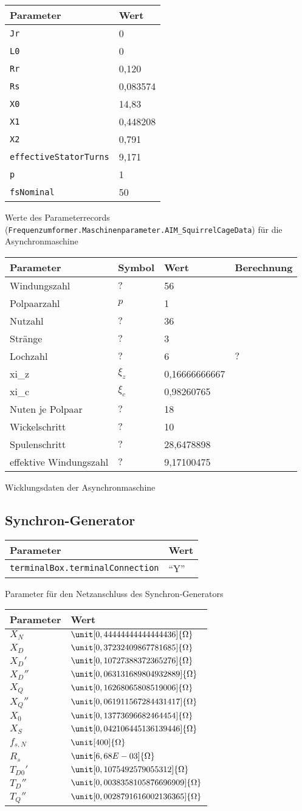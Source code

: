 \begin{longtable}[]{@{}ll@{}}
\toprule
Parameter & Wert\tabularnewline
\midrule
\endhead
\texttt{Jr} & 0\tabularnewline
\texttt{L0} & 0\tabularnewline
\texttt{Rr} & 0,120\tabularnewline
\texttt{Rs} & 0,083574\tabularnewline
\texttt{X0} & 14,83\tabularnewline
\texttt{X1} & 0,448208\tabularnewline
\texttt{X2} & 0,791\tabularnewline
\texttt{effectiveStatorTurns} & 9,171\tabularnewline
\texttt{p} & 1\tabularnewline
\texttt{fsNominal} & 50\tabularnewline
\bottomrule
\end{longtable}

Werte des Parameterrecords
(\texttt{Frequenzumformer.Maschinenparameter.AIM\_SquirrelCageData}) für
die Asynchronmaschine

\begin{longtable}[]{@{}llll@{}}
\toprule
Parameter & Symbol & Wert & Berechnung\tabularnewline
\midrule
\endhead
Windungszahl & \(?\) & 56 &\tabularnewline
Polpaarzahl & \(p\) & 1 &\tabularnewline
Nutzahl & \(?\) & 36 &\tabularnewline
Stränge & \(?\) & 3 &\tabularnewline
Lochzahl & \(?\) & 6 & \(?\)\tabularnewline
xi\_z & \(\xi_z\) & 0,16666666667 &\tabularnewline
xi\_c & \(\xi_c\) & 0,98260765 &\tabularnewline
Nuten je Polpaar & \(?\) & 18 &\tabularnewline
Wickelschritt & \(?\) & 10 &\tabularnewline
Spulenschritt & \(?\) & 28,6478898 &\tabularnewline
effektive Windungszahl & \(?\) & 9,17100475 &\tabularnewline
\bottomrule
\end{longtable}

Wicklungsdaten der Asynchronmaschine

\hypertarget{synchron-generator}{%
\subsection{Synchron-Generator}\label{synchron-generator}}

\begin{longtable}[]{@{}ll@{}}
\toprule
Parameter & Wert\tabularnewline
\midrule
\endhead
\texttt{terminalBox.terminalConnection} & ``Y''\tabularnewline
\bottomrule
\end{longtable}

Parameter für den Netzanschluss des Synchron-Generators

\begin{longtable}[]{@{}ll@{}}
\toprule
Parameter & Wert\tabularnewline
\midrule
\endhead
\(X_N\) & \(\unit[0,44444444444444436]{\Omega}\)\tabularnewline
\(X_D\) & \(\unit[0,37232409867781685]{\Omega}\)\tabularnewline
\(X_D'\) & \(\unit[0,10727388372365276]{\Omega}\)\tabularnewline
\(X_D''\) & \(\unit[0,063131689804932889]{\Omega}\)\tabularnewline
\(X_Q\) & \(\unit[0,16268065808519006]{\Omega}\)\tabularnewline
\(X_Q''\) & \(\unit[0,061911567284431417]{\Omega}\)\tabularnewline
\(X_0\) & \(\unit[0,13773696682464454]{\Omega}\)\tabularnewline
\(X_S\) & \(\unit[0,042106445136139446]{\Omega}\)\tabularnewline
\(f_{s,N}\) & \(\unit[400]{\Omega}\)\tabularnewline
\(R_s\) & \(\unit[6,68E-03]{\Omega}\)\tabularnewline
\(T_{D0}'\) & \(\unit[0,1075492579055312]{\Omega}\)\tabularnewline
\(T_D''\) & \(\unit[0,0038358105876696909]{\Omega}\)\tabularnewline
\(T_Q''\) & \(\unit[0,0028791616002136365]{\Omega}\)\tabularnewline
\bottomrule
\end{longtable}

